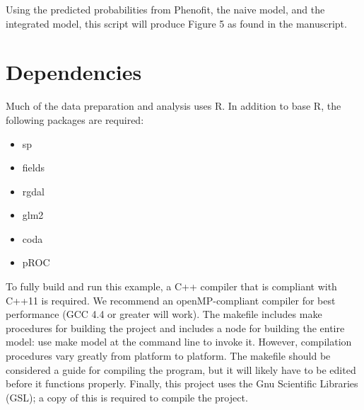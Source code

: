 \documentclass[11pt]{article}
\newcommand{\code}[1]{\colorbox{light-gray}{\ttfamily #1}}
\begin{document}
Using the predicted probabilities from Phenofit, the naive model, and the integrated model, this script will produce Figure 5 as found in the manuscript.


\section{Dependencies}
Much of the data preparation and analysis uses R. In addition to base R, the following packages are required:
\begin{itemize}
	\item sp
	\item fields
	\item rgdal
	\item glm2
	\item coda
	\item pROC
\end{itemize}

To fully build and run this example, a C++ compiler that is compliant with C++11 is required. 
We recommend an openMP-compliant compiler for best performance (GCC 4.4 or greater will work).
The makefile includes make procedures for building the project and includes a node for building the entire model: use \code{make model} at the command line to invoke it.
However, compilation procedures vary greatly from platform to platform.
The makefile should be considered a guide for compiling the program, but it will likely have to be edited before it functions properly.
Finally, this project uses the Gnu Scientific Libraries (GSL); a copy of this is required to compile the project.
\end{document}
